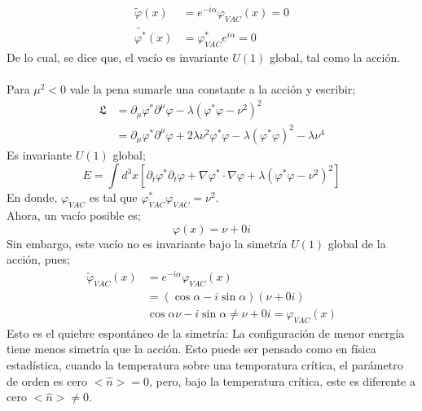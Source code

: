 \documentclass[../main.tex]{subfiles}
\begin{document}
\begin{align*}
  \tilde{\varphi}(x)& = e^{-i\alpha}\varphi_{VAC}(x) = 0 \\
  \tilde{\varphi^*}(x) & = \varphi^*_{VAC}e^{i\alpha} = 0
\end{align*}
De lo cual, se dice que, el vacío es invariante $U(1)$ global, tal como la acción. \\
\\
Para $\mu^2<0$ vale la pena sumarle una constante a la acción y escribir;
\begin{align*}
  \mathfrak{L} & = \partial_\mu \varphi^* \partial^\mu \varphi - \lambda \left( \varphi^* \varphi - \nu^2 \right)^2 \\
  & = \partial_\mu \varphi^* \partial^\mu\varphi + 2\lambda \nu^2 \varphi^* \varphi - \lambda \left( \varphi^* \varphi \right)^2 - \lambda \nu^4
 \end{align*}
 Es invariante $U(1)$ global;
 \begin{equation}
   E = \int d^3x \left[ \partial_t\varphi^* \partial_t\varphi + \nabla\varphi^* \cdot \nabla \varphi + \lambda \left( \varphi^* \varphi - \nu^2 \right)^2 \right]
  \end{equation}
  En donde, $\varphi_{VAC}$ es tal que $\varphi^*_{VAC}\varphi_{VAC} = \nu^2$. \\
  Ahora, un vacío posible es;
  \begin{equation}
    \varphi(x) = \nu + 0i
   \end{equation}
  Sin embargo, este vacío no es invariante bajo la simetría $U(1)$ global de la acción, pues;
  \begin{align*}
    \tilde{\varphi}_{VAC}(x) & = e^{-i\alpha}\varphi_{VAC}(x) \\
    & = \left( \cos{\alpha} - i\sin{\alpha} \right) \left( \nu+0i \right) \\
    & \cos{\alpha} \nu - i\sin{\alpha} \neq \nu + 0i = \varphi_{VAC}(x)
  \end{align*}
  Esto es el quiebre espontáneo de la simetría: La configuración de menor energía tiene menos simetría que la acción. Esto puede ser pensado como en física estadística, cuando la temperatura sobre una temporatura crítica, el parámetro de orden es cero $<\hat{n}>=0$, pero, bajo la temperatura crítica, este es diferente a cero $<\hat{n}>\neq 0$. \\
\end{document}
